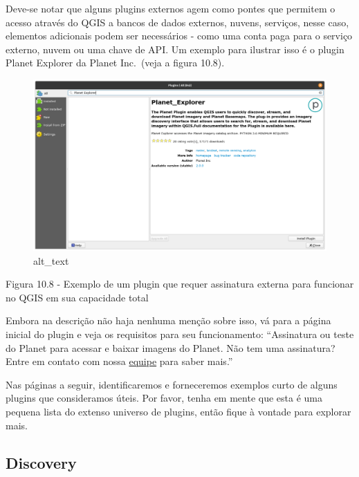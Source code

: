 \documentclass[
  portuguese,
]{krantz}
\begin{document}
Deve-se notar que alguns plugins externos agem como pontes que permitem o acesso através do QGIS a bancos de dados externos, nuvens, serviços, nesse caso, elementos adicionais podem ser necessários - como uma conta paga para o serviço externo, nuvem ou uma chave de API. Um exemplo para ilustrar isso é o plugin Planet Explorer da Planet Inc.~(veja a figura 10.8).

\begin{figure}
\centering
\includegraphics{media/modulo10/fig108.png}
\caption{alt\_text}
\end{figure}

Figura 10.8 - Exemplo de um plugin que requer assinatura externa para funcionar no QGIS em sua capacidade total

Embora na descrição não haja nenhuma menção sobre isso, vá para a página inicial do plugin e veja os requisitos para seu funcionamento: ``Assinatura ou teste do Planet para acessar e baixar imagens do Planet. Não tem uma assinatura? Entre em contato com nossa \href{https://www.planet.com/contact/}{equipe} para saber mais.''

Nas páginas a seguir, identificaremos e forneceremos exemplos curto de alguns plugins que consideramos úteis. Por favor, tenha em mente que esta é uma pequena lista do extenso universo de plugins, então fique à vontade para explorar mais.

\hypertarget{discovery}{%
\subsection{\texorpdfstring{\textbf{Discovery}}{Discovery}}\label{discovery}}
\end{document}
